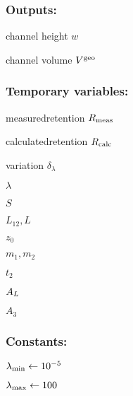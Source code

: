 \subsubsection*{Outputs:}
\vspace*{-2ex}
\begin{multicols}{3}
  \begin{packed_item}
    \item channel height $w$ 
    \item channel volume $V^\text{geo}$    
  \end{packed_item}
\end{multicols}
\vspace*{-4ex}
\subsubsection*{Temporary variables:}
\vspace*{-2ex}
\begin{multicols}{3}
  \begin{packed_item}
    \item measured\enspace retention $R_\text{meas}$
    \item calculated\enspace retention $R_\text{calc}$
    \item variation $δ_λ$
    \item $λ$
    \item $S$
    \item $L_{12}, L$
    \item $z_0$
    \item $m_1, m_2$
    \item $t_2$
    \item $A_L$
    \item $A_3$
  \end{packed_item}
\end{multicols}
\vspace*{-4ex}
\subsubsection*{Constants:}
\vspace*{-2ex}
\begin{multicols}{3}
  \begin{packed_item}
    \item $\lambda_\text{min} \leftarrow 10^{-5}$
    \item  $\lambda_\text{max} \leftarrow 100$ 
    \end{packed_item}
  \end{multicols}
\vspace*{-2ex}

